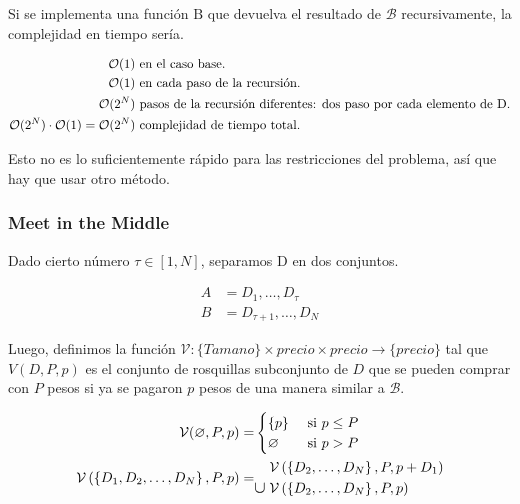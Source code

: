Si se implementa una función \( \mathrm{B} \) que devuelva el resultado de \( \mathcal{B} \) recursivamente, la complejidad en tiempo sería.

\begin{align*}
	\mathcal{O}(1) & \text{ en el caso base.} \\
	\mathcal{O}(1) & \text{ en cada paso de la recursión.} \\
	\mathcal{O}(2^N) & \text{ pasos de la recursión diferentes: dos paso por cada elemento de D.} \\
	\mathcal{O}(2^N) \cdot \mathcal{O}(1) = \mathcal{O}(2^N) & \text{ complejidad de tiempo total.}
\end{align*}

Esto no es lo suficientemente rápido para las restricciones del problema, así que hay que usar otro método.

\subsubsection{Meet in the Middle}

Dado cierto número \( \tau \in \left[ 1, N\right ] \), separamos D en dos conjuntos.

\begin{align*}
	A &= D_1, \ldots, D_\tau \\
	B &= D_{\tau + 1}, \ldots, D_N
\end{align*}

Luego, definimos la función \( \mathcal{V} : \{Tamano\} \times precio \times precio \rightarrow \{precio\} \) tal que \( V(D, P, p) \) es el conjunto de rosquillas subconjunto de \( D \) que se pueden comprar con \( P \) pesos si ya se pagaron \( p \) pesos de una manera similar a \( \mathcal{B} \).

\begin{align*}
\mathcal{V} (\varnothing, P, p) =
	&\begin{cases}
		\{p\} & \text{ si \(p \leq P\)} \\
		\varnothing & \text{ si \(p > P\)}
	\end{cases} \\
\mathcal{V} \left( \left\{ D_1, D_2, \ldots, D_N \right\}, P, p \right) = &
	\begin{aligned}
		& \mathcal{V} \left( \left\{ D_2, \ldots, D_N \right\}, P, p + D_1 \right) \\
		\mathlarger{\cup} \; & \mathcal{V} \left( \left\{ D_2, \ldots, D_N \right\}, P, p \right)
	\end{aligned}
\end{align*}

